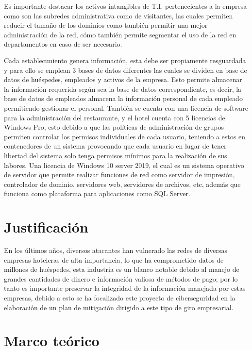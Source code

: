 \documentclass[10pt]{article}
\begin{document}
Es importante destacar los activos intangibles de T.I. pertenecientes a la empresa como son las subredes administrativa como de visitantes, las cuales permiten reducir el tamaño de los dominios como también permitir una mejor administración de la red, cómo también permite segmentar el uso de la red en departamentos en caso de ser necesario.


Cada establecimiento genera información, esta debe ser propiamente resguardada y para ello se emplean 3 bases de datos diferentes las cuales se dividen en base de datos de huéspedes, empleados y activos de la empresa. Esto permite almacenar la información requerida según sea la base de datos correspondiente, es decir, la base de datos de empleados almacena la información personal de cada empleado permitiendo gestionar el personal. También se cuenta con una licencia de software para la administración del restaurante, y el hotel cuenta con 5 licencias de Windows Pro, esto debido a que las políticas de administración de grupos permiten controlar los permisos individuales de cada usuario, teniendo a estos en contenedores de un sistema provocando que cada usuario en lugar de tener libertad del sistema solo tenga permisos mínimos para la realización de sus labores. Una licencia de Windows 10 server 2019, el cual es un sistema operativo de servidor que permite realizar funciones de red como servidor de impresión, controlador de dominio, servidores web, servidores de archivos, etc, además que funciona como plataforma para aplicaciones como SQL Server.

\section{Justificación}

En los últimos años, diversos atacantes han vulnerado las redes de diversas empresas hoteleras de alta importancia, lo que ha comprometido datos de millones de huéspedes, esta industria es un blanco notable debido al  manejo de grandes cantidades de dinero e información valiosa de métodos de pago; por lo tanto es importante preservar la integridad de la información manejada por estas empresas, debido a esto se ha focalizado este proyecto de ciberseguridad en la elaboración de un plan de mitigación dirigido a este tipo de giro empresarial.

\section{Marco teórico}
\end{document}
